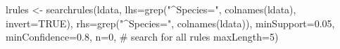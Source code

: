 \begin{Schunk}
% --begin: "casestudy-assoc-searchrules"
\begin{Sinput}
lrules <- searchrules(ldata,
                      lhs=grep("^Species=", colnames(ldata), invert=TRUE),
                      rhs=grep("^Species=", colnames(ldata)),
                      minSupport=0.05,
                      minConfidence=0.8,
                      n=0, # search for all rules
                      maxLength=5)
\end{Sinput}
%
% --end: "casestudy-assoc-searchrules"
\end{Schunk}

